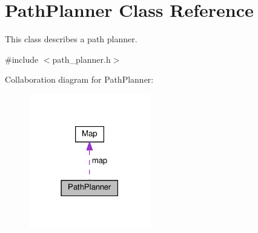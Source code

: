 \hypertarget{class_path_planner}{}\section{Path\+Planner Class Reference}
\label{class_path_planner}


This class describes a path planner.  




{\ttfamily \#include $<$path\+\_\+planner.\+h$>$}



Collaboration diagram for Path\+Planner\+:
\nopagebreak
\begin{figure}[H]
\begin{center}
\leavevmode
\includegraphics[width=150pt]{class_path_planner__coll__graph}
\end{center}
\end{figure}
